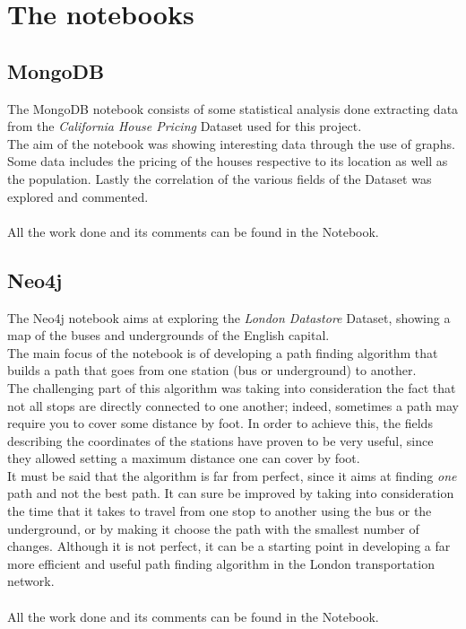 \documentclass{Configuration_Files/PoliMi3i_thesis}
\begin{document}
\section{The notebooks}

\subsection{MongoDB}
The MongoDB notebook consists of some statistical analysis done extracting data from the \textit{California House Pricing} Dataset used for this project.\\
The aim of the notebook was showing interesting data through the use of graphs. Some data includes the pricing of the houses respective to its location as well as the population. Lastly the correlation of the various fields of the Dataset was explored and commented.\\\\
All the work done and its comments can be found in the Notebook.

\subsection{Neo4j}
The Neo4j notebook aims at exploring the \textit{London Datastore} Dataset, showing a map of the buses and undergrounds of the English capital.\\
The main focus of the notebook is of developing a path finding algorithm that builds a path that goes from one station (bus or underground) to another.\\
The challenging part of this algorithm was taking into consideration the fact that not all stops are directly connected to one another; indeed, sometimes a path may require you to cover some distance by foot. In order to achieve this, the fields describing the coordinates of the stations have proven to be very useful, since they allowed setting a maximum distance one can cover by foot.\\
It must be said that the algorithm is far from perfect, since it aims at finding \textit{one} path and not the best path. It can sure be improved by taking into consideration the time that it takes to travel from one stop to another using the bus or the underground, or by making it choose the path with the smallest number of changes. Although it is not perfect, it can be a starting point in developing a far more efficient and useful path finding algorithm in the London transportation network.\\\\
All the work done and its comments can be found in the Notebook.


\listoffigures

\listoftables

\cleardoublepage
\end{document}
